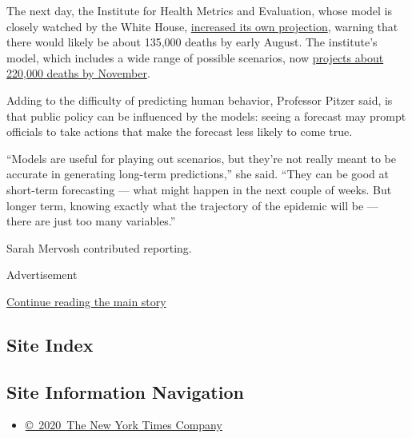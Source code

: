 The next day, the Institute for Health Metrics and Evaluation, whose
model is closely watched by the White House,
\href{http://www.healthdata.org/news-release/new-ihme-forecast-projects-nearly-135000-covid-19-deaths-us}{increased
its own projection}, warning that there would likely be about 135,000
deaths by early August. The institute's model, which includes a wide
range of possible scenarios, now
\href{https://covid19.healthdata.org/united-states-of-america}{projects
about 220,000 deaths by November}.

Adding to the difficulty of predicting human behavior, Professor Pitzer
said, is that public policy can be influenced by the models: seeing a
forecast may prompt officials to take actions that make the forecast
less likely to come true.

``Models are useful for playing out scenarios, but they're not really
meant to be accurate in generating long-term predictions,'' she said.
``They can be good at short-term forecasting --- what might happen in
the next couple of weeks. But longer term, knowing exactly what the
trajectory of the epidemic will be ---~ there are just too many
variables.''

Sarah Mervosh contributed reporting.

Advertisement

\protect\hyperlink{after-bottom}{Continue reading the main story}

\hypertarget{site-index}{%
\subsection{Site Index}\label{site-index}}

\hypertarget{site-information-navigation}{%
\subsection{Site Information
Navigation}\label{site-information-navigation}}

\begin{itemize}
\tightlist
\item
  \href{https://help.nytimes.com/hc/en-us/articles/115014792127-Copyright-notice}{©~2020~The
  New York Times Company}
\end{itemize}

